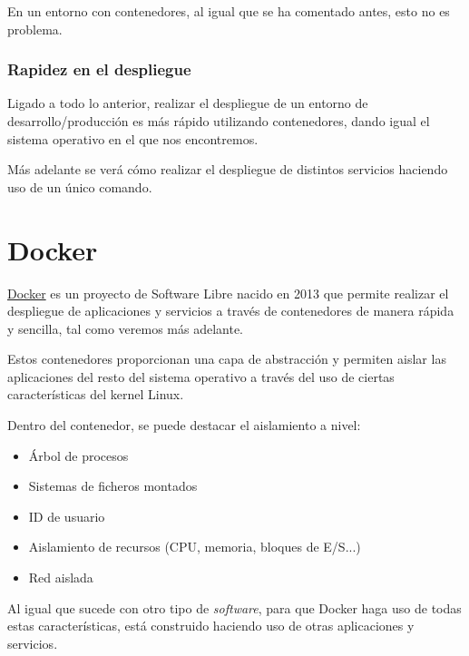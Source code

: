 
En un entorno con contenedores, al igual que se ha comentado antes, esto no es problema.

\subsection{Rapidez en el despliegue}

Ligado a todo lo anterior, realizar el despliegue de un entorno de desarrollo/producción es más rápido utilizando contenedores, dando igual el sistema operativo en el que nos encontremos.


Más adelante se verá cómo realizar el despliegue de distintos servicios haciendo uso de un único comando.


\chapter{Docker}

\href{https://www.docker.com/}{Docker} es un proyecto de Software Libre nacido en 2013 que permite realizar el despliegue de aplicaciones y servicios a través de contenedores de manera rápida y sencilla, tal como veremos más adelante.

Estos contenedores proporcionan una capa de abstracción y permiten aislar las aplicaciones del resto del sistema operativo a través del uso de ciertas características del kernel Linux.

Dentro del contenedor, se puede destacar el aislamiento a nivel:

\begin{itemize}
    \item Árbol de procesos
    \item Sistemas de ficheros montados
    \item ID de usuario
    \item Aislamiento de recursos (CPU, memoria, bloques de E/S...)
    \item Red aislada
\end{itemize}

Al igual que sucede con otro tipo de \textit{software},  para que Docker haga uso de todas estas características, está construido haciendo uso de otras aplicaciones y servicios.


